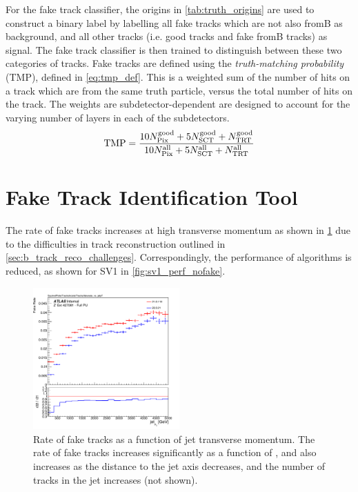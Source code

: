For the fake track classifier, the origins in \cref{tab:truth_origins} are used to construct a binary label by labelling all fake tracks which are not also fromB as background, and all other tracks (i.e. good tracks and fake fromB tracks) as signal.
The fake track classifier is then trained to distinguish between these two categories of tracks.
Fake tracks are defined using the \textit{truth-matching probability} (TMP), defined in \cref{eq:tmp_def}.
This is a weighted sum of the number of hits on a track which are from the same truth particle, versus the total number of hits on the track.
The weights are subdetector-dependent are designed to account for the varying number of layers in each of the subdetectors.
%
\begin{equation}\label{eq:tmp_def}
    \textnormal{TMP} = 
    \frac{
        10 N_{\textnormal{Pix}}^{\textnormal{good}} + 
        5  N_{\textnormal{SCT}}^{\textnormal{good}} + 
           N_{\textnormal{TRT}}^{\textnormal{good}}
        }{
        10 N_{\textnormal{Pix}}^{\textnormal{all}} + 
        5  N_{\textnormal{SCT}}^{\textnormal{all}} + 
            N_{\textnormal{TRT}}^{\textnormal{all}}
        }
\end{equation}
%


\section{Fake Track Identification Tool}\label{sec:fake_track_mva}


The rate of fake tracks increases at high transverse momentum as shown in \cref{fig:fakerate_vs_pt} due to the difficulties in track reconstruction outlined in \cref{sec:b_track_reco_challenges}.
Correspondingly, the performance of \btagging algorithms is reduced, as shown for SV1 in \cref{fig:sv1_perf_nofake}.

\begin{figure}[!htbp]
    \centering
    \includegraphics[width=0.5\textwidth]{chapters/track_classifier/figs/fakerate_vs_pt.pdf}
    \caption{
      Rate of fake tracks as a function of jet transverse momentum.
      The rate of fake tracks increases significantly as a function of \pt, and also increases as the distance to the jet axis decreases, and the number of tracks in the jet increases (not shown).
    }
    \label{fig:fakerate_vs_pt}
  \end{figure}
  
